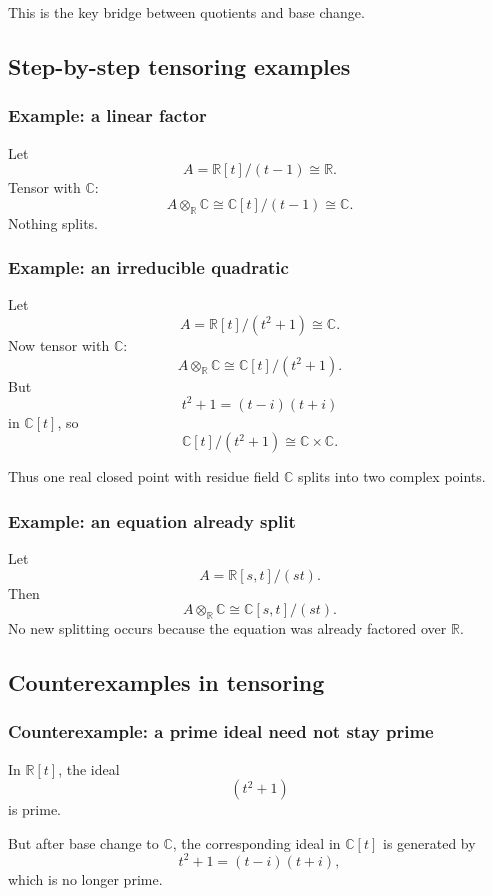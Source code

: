 \documentclass[12pt,a4paper]{article}
\theoremstyle{notespace}
\theoremstyle{definition}
\begin{document}
This is the key bridge between quotients and base change.

\subsection{Step-by-step tensoring examples}

\subsubsection{Example: a linear factor}

Let
\[
A=\mathbb R[t]/(t-1)\cong \mathbb R.
\]
Tensor with \(\mathbb C\):
\[
A\otimes_{\mathbb R}\mathbb C
\cong
\mathbb C[t]/(t-1)
\cong
\mathbb C.
\]
Nothing splits.

\subsubsection{Example: an irreducible quadratic}

Let
\[
A=\mathbb R[t]/(t^2+1)\cong \mathbb C.
\]
Now tensor with \(\mathbb C\):
\[
A\otimes_{\mathbb R}\mathbb C
\cong
\mathbb C[t]/(t^2+1).
\]
But
\[
t^2+1=(t-i)(t+i)
\]
in \(\mathbb C[t]\), so
\[
\mathbb C[t]/(t^2+1)\cong \mathbb C\times \mathbb C.
\]

Thus one real closed point with residue field \(\mathbb C\) splits into two complex points.

\subsubsection{Example: an equation already split}

Let
\[
A=\mathbb R[s,t]/(st).
\]
Then
\[
A\otimes_{\mathbb R}\mathbb C
\cong
\mathbb C[s,t]/(st).
\]
No new splitting occurs because the equation was already factored over \(\mathbb R\).

\subsection{Counterexamples in tensoring}

\subsubsection{Counterexample: a prime ideal need not stay prime}

In \(\mathbb R[t]\), the ideal
\[
(t^2+1)
\]
is prime.

But after base change to \(\mathbb C\), the corresponding ideal in \(\mathbb C[t]\) is generated by
\[
t^2+1=(t-i)(t+i),
\]
which is no longer prime.
\end{document}
